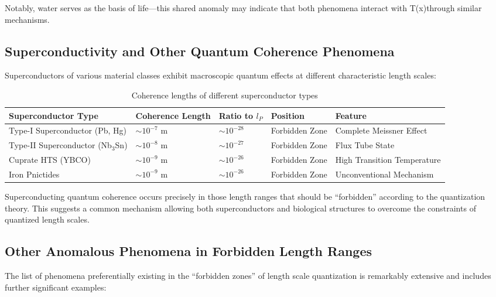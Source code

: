 \documentclass[12pt,a4paper]{article}
\newcommand{\Tfield}{T(x)}
\begin{document}
	Notably, water serves as the basis of life—this shared anomaly may indicate that both phenomena interact with \Tfield through similar mechanisms.
	
	\subsection{Superconductivity and Other Quantum Coherence Phenomena}
	
	Superconductors of various material classes exhibit macroscopic quantum effects at different characteristic length scales:
	
	\begin{table}[h]
		\centering
		\begin{adjustbox}{scale=0.75}
			\begin{tabular}{lllll}
				\hline
				\textbf{Superconductor Type} & \textbf{Coherence Length} & \textbf{Ratio to $l_P$} & \textbf{Position} & \textbf{Feature} \\
				\hline
				Type-I Superconductor (Pb, Hg) & $\sim 10^{-7}$ m & $\sim 10^{-28}$ & Forbidden Zone & Complete Meissner Effect \\
				Type-II Superconductor (Nb$_3$Sn) & $\sim 10^{-8}$ m & $\sim 10^{-27}$ & Forbidden Zone & Flux Tube State \\
				Cuprate HTS (YBCO) & $\sim 10^{-9}$ m & $\sim 10^{-26}$ & Forbidden Zone & High Transition Temperature \\
				Iron Pnictides & $\sim 10^{-9}$ m & $\sim 10^{-26}$ & Forbidden Zone & Unconventional Mechanism \\
				\hline
			\end{tabular}
		\end{adjustbox}
		\caption{Coherence lengths of different superconductor types}
		\label{tab:supercond}
	\end{table}
	
	Superconducting quantum coherence occurs precisely in those length ranges that should be ``forbidden'' according to the quantization theory. This suggests a common mechanism allowing both superconductors and biological structures to overcome the constraints of quantized length scales.
	
	\subsection{Other Anomalous Phenomena in Forbidden Length Ranges}
	
	The list of phenomena preferentially existing in the ``forbidden zones'' of length scale quantization is remarkably extensive and includes further significant examples:
	
\end{document}
